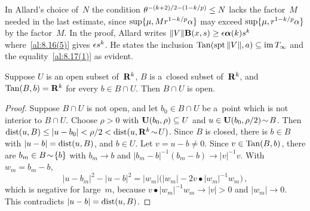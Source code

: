 \begin{remark}
    \label{rem:8.17}
    In Allard's choice of~$N$ the condition $\theta^{-(k+2)/2 - (1 - k/p)} \le N$ lacks the
    factor~$M$ needed in the last estimate, since $\sup \{ \mu, M r^{1-k/p} \alpha \}$ may exceed
    $\sup \{ \mu, r^{1-k/p} \alpha \}$ by the factor~$M$. In the proof, Allard writes $\|V\|
    \mathbf{B}(x,s) \ge \epsilon \boldsymbol{\alpha}(k) s^{k}$ where~\ref{al:8.16(5)} gives $\epsilon
    s^{k}$. He states the inclusion $\operatorname{Tan}(\operatorname{spt} \|V\|, a) \subseteq \operatorname{im} T_\infty$ and the
    equality~\ref{al:8.17(1)} as evident.
\end{remark}

\begin{lemma}
    \label{al:8.18}
    Suppose $U$ is an open subset of~$\mathbf{R}^{k}$, $B$ is a~closed subset of~$\mathbf{R}^{k}$, and
    $\operatorname{Tan}(B,b) = \mathbf{R}^{k}$ for every $b \in B \cap U$. Then $B \cap U$ is open.
\end{lemma}

\begin{proof}
    Suppose $B \cap U$ is not open, and let $b_0 \in B \cap U$ be a~point which is not interior to
    $B \cap U$. Choose $\rho > 0$ with $\mathbf{U}(b_0,\rho) \subseteq U$ and $u \in \mathbf{U}(b_0,\rho/2)
    \!\sim\! B$. Then $\operatorname{dist}(u, B) \le |u - b_0| < \rho/2 < \operatorname{dist}(u, \mathbf{R}^{k} \!\sim\! U)$. Since
    $B$ is closed, there is $b \in B$ with $|u - b| = \operatorname{dist}(u,B)$, and $b \in U$. Let $v = u - b \ne
    0$. Since $v \in \operatorname{Tan}(B,b)$, there are $b_m \in B \!\sim\! \{ b \}$ with $b_m \to b$ and
    $|b_m - b|^{-1} (b_m - b) \to |v|^{-1} v$. With $w_m = b_m - b$,
    \begin{displaymath}
        |u - b_m|^2 - |u - b|^2 = |w_m| \big( |w_m| - 2 v \bullet |w_m|^{-1} w_m \big) \,,
    \end{displaymath}
    which is negative for large~$m$, because $v \bullet |w_m|^{-1} w_m \to |v| > 0$ and $|w_m| \to 0$.
    This contradicts $|u - b| = \operatorname{dist}(u, B)$.
\end{proof}

